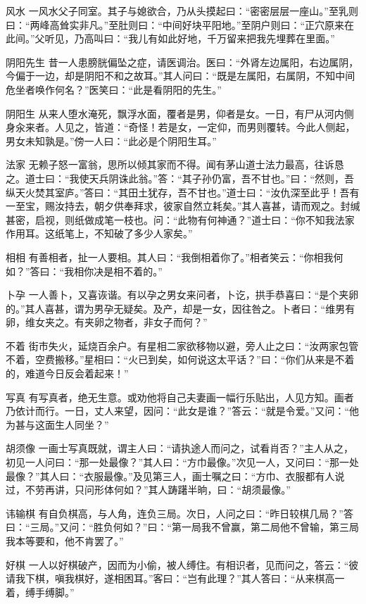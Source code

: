 \documentclass[12pt,UTF8]{ctexbook}
\begin{document}
风水
一风水父子同室。其子与媳欲合，乃从头摸起曰：“密密层层一座山。”至乳则曰：“两峰高耸实非凡。”至肚则曰：“中间好块平阳地。”至阴户则曰：“正穴原来在此间。”父听见，乃高叫曰：“我儿有如此好地，千万留来把我先埋葬在里面。”

阴阳先生
昔一人患膀胱偏坠之症，请医调治。医曰：“外肾左边属阳，右边属阴，今偏于一边，却是阴阳不和之故耳。”其人问曰：“既是左属阳，右属阴，不知中间危坐者唤作何名？”医笑曰：“此是看阴阳的先生。”

阴阳生
从来人堕水淹死，飘浮水面，覆者是男，仰者是女。一日，有尸从河内侧身汆来者。人见之，皆道：“奇怪！若是女，一定仰，而男则覆转。今此人侧起，男女未知孰是。”傍一人曰：“此必是个阴阳生耳。”

法家
无赖子怒一富翁，思所以倾其家而不得。闻有茅山道士法力最高，往诉恳之。道士曰：“我使天兵阴诛此翁。”答：“其子孙仍富，吾不甘也。”曰：“然则，吾纵天火焚其室庐。”答曰：“其田土犹存，吾不甘也。”道士曰：“汝仇深至此乎！吾有一至宝，赐汝持去，朝夕供奉拜求，彼家自然立耗矣。”其人喜甚，请而观之。封缄甚密，启视，则纸做成笔一枝也。问：“此物有何神通？”道士曰：“你不知我法家作用耳。这纸笔上，不知破了多少人家矣。”

相相
有善相者，扯一人要相。其人曰：“我倒相着你了。”相者笑云：“你相我何如？”答曰：“我相你决是相不着的。”

卜孕
一人善卜，又喜诙谐。有以孕之男女来问者，卜讫，拱手恭喜曰：“是个夹卵的。”其人喜甚，谓为男孕无疑矣。及产，却是一女，因往咎之。卜者曰：“维男有卵，维女夹之。有夹卵之物者，非女子而何？”

不着
街市失火，延烧百余户。有星相二家欲移物以避，旁人止之曰：“汝两家包管不着，空费搬移。”星相曰：“火已到矣，如何说这太平话？”曰：“你们从来是不着的，难道今日反会着起来！”

写真
有写真者，绝无生意。或劝他将自己夫妻画一幅行乐贴出，人见方知。画者乃依计而行。一日，丈人来望，因问：“此女是谁？”答云：“就是令爱。”又问：“他为甚与这面生人同坐？”

胡须像
一画士写真既就，谓主人曰：“请执途人而问之，试看肖否？”主人从之，初见一人问曰：“那一处最像？”其人曰：“方巾最像。”次见一人，又问曰：“那一处最像？”其人曰：“衣服最像。”及见第三人，画士嘱之曰：“方巾、衣服都有人说过，不劳再讲，只问形体何如？”其人踌躇半晌，曰：“胡须最像。”

讳输棋
有自负棋高，与人角，连负三局。次日，人问之曰：“昨日较棋几局？”答曰：“三局。”又问：“胜负何如？”曰：“第一局我不曾赢，第二局他不曾输，第三局我本等要和，他不肯罢了。”

好棋
一人以好棋破产，因而为小偷，被人缚住。有相识者，见而问之，答云：“彼请我下棋，嗔我棋好，遂相困耳。”客曰：“岂有此理？”其人答曰：“从来棋高一着，缚手缚脚。”
\end{document}
